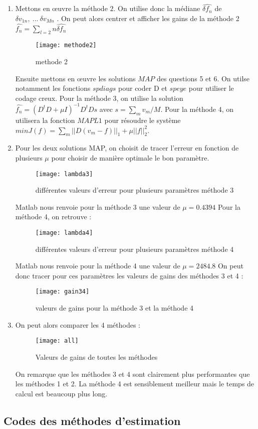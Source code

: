 \documentclass[12pt,a4paper,titlepage]{article}
\begin{document}
\begin{enumerate}
{	}
	\item{}Mettons en œuvre la méthode $2$. On utilise donc la médiane $\hat{\delta f_n}$ de $\delta v_{1n}, \ ...\ \delta v_{Mn}$ . On peut alors centrer et afficher les gains de la méthode 2 $\hat{f_n} = \sum_{l=2}n\hat{\delta f_n}$
	\begin{figure}[H]
    		\texttt{[image: methode2]}
		    		\centering
		\caption{methode 2}
	\end{figure}
	Ensuite mettons en œuvre les solutions $MAP$ des questions 5 et 6. On utilse notamment les fonctions $spdiags$ pour coder D et $speye$ pour utiliser le codage creux. Pour la méthode $3$, on utilise la solution $\hat{f_n}=(D^tD+\mu I)^{-1}D^tDs$ avec $s=\sum_m v_m/M$. Pour la méthode 4, on utilisera la fonction $MAPL1$ pour résoudre le système $min J(f) = \sum_m ||D(v_m-f)||_1+ \mu || f||_2^2$.
	\item{Pour les deux solutions MAP, on choisit de tracer l'erreur en fonction de plusieurs $\mu$ pour choisir de manière optimale le bon paramètre.
	\begin{figure}[H]
    		\texttt{[image: lambda3]}
    		\centering
		\caption{différentes valeurs d'erreur pour plusieurs paramètres méthode 3}
	\end{figure}
	Matlab nous renvoie pour la méthode 3 une valeur de $\mu=0.4394$
	Pour la méthode 4, on retrouve :
	\begin{figure}[H]
    		\texttt{[image: lambda4]}
    		\centering
		\caption{différentes valeurs d'erreur pour plusieurs paramètres méthode 4}
	\end{figure}
	Matlab nous renvoie pour la méthode 4 une valeur de $\mu=2484.8$
	On peut donc tracer pour ces paramètres les valeurs de gains des méthodes 3 et 4 :
	\begin{figure}[H]
    		\texttt{[image: gain34]}
    		\centering
		\caption{valeurs de gains pour la méthode 3 et la méthode 4}
	\end{figure}
	}
	\item{On peut alors comparer les 4 méthodes : 
	\begin{figure}[H]
    		\texttt{[image: all]}
    		\centering
		\caption{Valeurs de gains de toutes les méthodes }
	\end{figure}
	On remarque que les méthodes 3 et 4 sont clairement plus performantes que les méthodes 1 et 2. La méthode 4 est sensiblement meilleur mais le temps de calcul est beaucoup plus long.
	}
\end{enumerate}

\pagebreak

\begin{appendices}
  \section{Codes des méthodes d'estimation}
    
\end{appendices}
  
\end{document}
